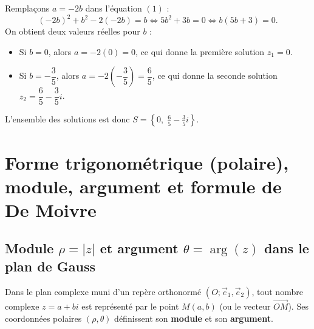 \begin{exemple}
\begin{enumerate}
\[    \]
    Remplaçons $a = -2b$ dans l'équation $(1)$ :
    \[
        (-2b)^2 + b^2 - 2(-2b) = b \iff 5b^2 + 3b = 0 \iff b(5b + 3) = 0.
    \]
    On obtient deux valeurs réelles pour $b$ :
    \begin{itemize}
        \item Si $b = 0$, alors $a = -2(0) = 0$, ce qui donne la première solution $z_1 = 0$.
        \item Si $b = -\dfrac{3}{5}$, alors $a = -2\left(-\dfrac{3}{5}\right) = \dfrac{6}{5}$, ce qui donne la seconde solution $z_2 = \dfrac{6}{5} - \dfrac{3}{5}i$.
    \end{itemize}
    L'ensemble des solutions est donc $\boxed{S = \left\{0,\; \frac{6}{5} - \frac{3}{5}i\right\}}$.
\end{enumerate}
\end{exemple}

\section{Forme trigonométrique (polaire), module, argument et formule de De Moivre}

\subsection{Module $\rho = |z|$ et argument $\theta = \arg(z)$ dans le plan de Gauss}

Dans le plan complexe muni d'un repère orthonormé $(O; \vec{e}_1, \vec{e}_2)$, tout nombre complexe $z = a + bi$ est représenté par le point $M(a, b)$ (ou le vecteur $\overrightarrow{OM}$). Ses coordonnées polaires $(\rho, \theta)$ définissent son \textbf{module} et son \textbf{argument}.

